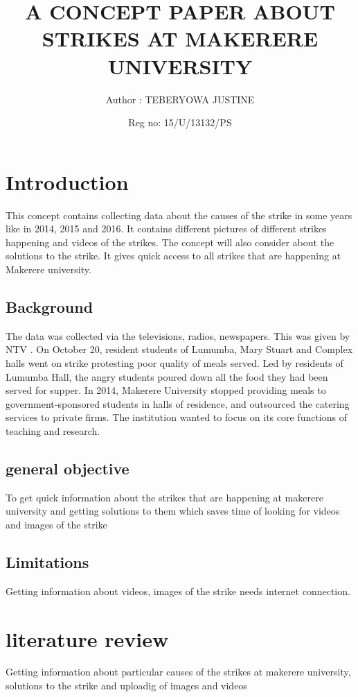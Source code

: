 \documentclass{article}
\begin{document}
		\title{A CONCEPT PAPER ABOUT STRIKES AT MAKERERE UNIVERSITY}
		\author{Author :  TEBERYOWA  JUSTINE }
		
                      \date{Reg no: 15/U/13132/PS}
		\maketitle
	

	\tableofcontents

	
\section{Introduction}
This concept contains collecting data about the causes of the strike in some years like in 2014, 2015 and 2016. It contains different pictures of different strikes happening and videos of the strikes.
The concept will also consider about the solutions to the strike.
It gives quick access to all strikes that are happening at Makerere university.

\subsection{Background}
The data was collected via the televisions, radios, newspapers. This was given by NTV .
On October 20, resident students of Lumumba, Mary Stuart and Complex halls went on strike protesting poor quality of meals served. Led by residents of Lumumba Hall, the angry students poured down all the food they had been served for supper.
In 2014, Makerere University stopped providing meals to government-sponsored students in halls of residence, and outsourced the catering services to private firms. The institution wanted to focus on its core functions of teaching and research.

\subsection{general objective}
To get quick information about the strikes that are happening at makerere university and getting solutions to them which saves time of looking for videos and images of the strike


 \subsection{Limitations}
Getting information  about videos, images of the strike needs internet connection.


\section{literature review}
Getting information about particular causes of the strikes at makerere university, solutions to the strike and uploadig of images and videos
\end{document}

